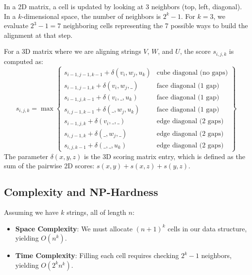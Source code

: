 In a 2D matrix, a cell is updated by looking at 3 neighbors (top, left, diagonal). 
In a $k$-dimensional space, the number of neighbors is $2^k - 1$. For $k=3$, we evaluate $2^3 - 1 = 7$ neighboring cells representing the 7 possible ways to build the alignment at that step.

For a 3D matrix where we are aligning strings $V$, $W$, and $U$, the score $s_{i,j,k}$ is computed as:
\begin{equation} \label{eq:3d_dp}
s_{i, j, k} = \max \left\{ 
\begin{array}{ll} 
s_{i-1, j-1, k-1} + \delta(v_i, w_j, u_k) & \text{cube diagonal (no gaps)} \\ 
s_{i-1, j-1, k} + \delta(v_i, w_j, \text{\_}) & \text{face diagonal (1 gap)} \\ 
s_{i-1, j, k-1} + \delta(v_i, \text{\_}, u_k) & \text{face diagonal (1 gap)} \\ 
s_{i, j-1, k-1} + \delta(\text{\_}, w_j, u_k) & \text{face diagonal (1 gap)} \\ 
s_{i-1, j, k} + \delta(v_i, \text{\_}, \text{\_}) & \text{edge diagonal (2 gaps)} \\ 
s_{i, j-1, k} + \delta(\text{\_}, w_j, \text{\_}) & \text{edge diagonal (2 gaps)} \\ 
s_{i, j, k-1} + \delta(\text{\_}, \text{\_}, u_k) & \text{edge diagonal (2 gaps)} 
\end{array} 
\right\}
\end{equation}
The parameter $\delta(x,y,z)$ is the 3D scoring matrix entry, which is defined as the sum of the pairwise 2D scores: $s(x,y) + s(x,z) + s(y,z)$.


\subsection{Complexity and NP-Hardness}

Assuming we have $k$ strings, all of length $n$:
\begin{itemize}
    \item \textbf{Space Complexity}: We must allocate $(n+1)^k$ cells in our data structure, yielding $O(n^k)$.
    \item \textbf{Time Complexity}: Filling each cell requires checking $2^k - 1$ neighbors, yielding $O(2^k n^k)$.
\end{itemize}

